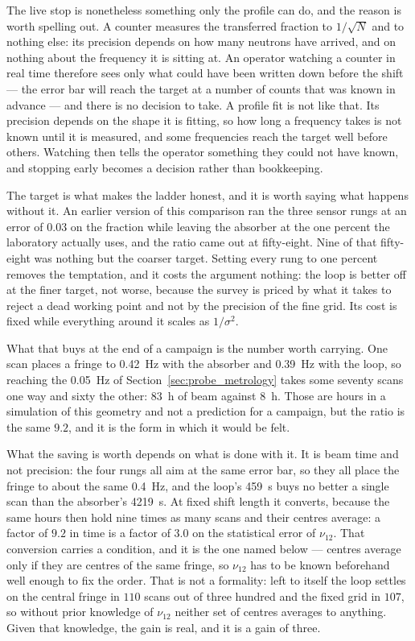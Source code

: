\documentclass[a4paper,headsepline,oneside,11pt]{scrartcl}
\begin{document}
The live stop is nonetheless something only the profile can do, and the reason
is worth spelling out. A counter measures the transferred fraction to
$1/\sqrt{N}$ and to nothing else: its precision depends on how many neutrons
have arrived, and on nothing about the frequency it is sitting at. An operator
watching a counter in real time therefore sees only what could have been written
down before the shift --- the error bar will reach the target at a number of
counts that was known in advance --- and there is no decision to take. A profile
fit is not like that. Its precision depends on the shape it is fitting, so how
long a frequency takes is not known until it is measured, and some frequencies
reach the target well before others. Watching then tells the operator something
they could not have known, and stopping early becomes a decision rather than
bookkeeping.

The target is what makes the ladder honest, and it is worth saying what happens
without it. An earlier version of this comparison ran the three sensor rungs at
an error of $0.03$ on the fraction while leaving the absorber at the one percent
the laboratory actually uses, and the ratio came out at fifty-eight. Nine of
that fifty-eight was nothing but the coarser target. Setting every rung to one
percent removes the temptation, and it costs the argument nothing: the loop is
better off at the finer target, not worse, because the survey is priced by what
it takes to reject a dead working point and not by the precision of the fine
grid. Its cost is fixed while everything around it scales as $1/\sigma^2$.

What that buys at the end of a campaign is the number worth carrying. One scan
places a fringe to \SI{0.42}{\hertz} with the absorber and \SI{0.39}{\hertz}
with the loop, so reaching the \SI{0.05}{\hertz} of
Section~\ref{sec:probe_metrology} takes some seventy scans one way and sixty the
other: \SI{83}{\hour} of beam against \SI{8}{\hour}. Those are hours in a
simulation of this geometry and not a prediction for a campaign, but the ratio
is the same $9.2$, and it is the form in which it would be felt.

What the saving is worth depends on what is done with it. It is beam time and
not precision: the four rungs all aim at the same error bar, so they all place
the fringe to about the same \SI{0.4}{\hertz}, and the loop's \SI{459}{\second}
buys no better a single scan than the absorber's \SI{4219}{\second}. At fixed
shift length it converts, because the same hours then hold nine times as many
scans and their centres average: a factor of $9.2$ in time is a factor of $3.0$
on the statistical error of $\nu_{12}$. That conversion carries a condition, and it is
the one named below --- centres average only if they are centres of the same
fringe, so $\nu_{12}$ has to be known beforehand well enough to fix the order.
That is not a formality: left to itself the loop settles on the central fringe
in $110$ scans out of three hundred and the fixed grid in $107$, so without
prior knowledge of $\nu_{12}$ neither set of centres averages to anything. Given
that knowledge, the gain is real, and it is a gain of three.
\end{document}
